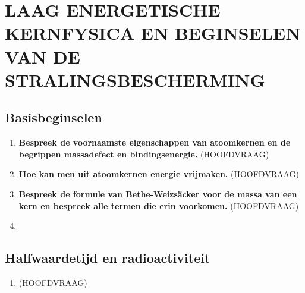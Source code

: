\documentclass[12pt]{article}
\begin{document}
    \maketitle

    \section{LAAG ENERGETISCHE KERNFYSICA EN BEGINSELEN VAN DE STRALINGSBESCHERMING}
    \subsection{Basisbeginselen}
    \begin{enumerate}
        \item \textbf{Bespreek de voornaamste eigenschappen van atoomkernen en de begrippen massadefect en bindingsenergie.} (HOOFDVRAAG)
        \item \textbf{Hoe kan men uit atoomkernen energie vrijmaken.} (HOOFDVRAAG)
        \item \textbf{Bespreek de formule van Bethe-Weizsäcker voor de massa van een kern en bespreek alle termen die erin voorkomen.} (HOOFDVRAAG)
        \item 
    \end{enumerate}
    \subsection{Halfwaardetijd en radioactiviteit}
    \begin{enumerate}
        \item \textbf{} (HOOFDVRAAG)
    \end{enumerate}
    
\end{document}
